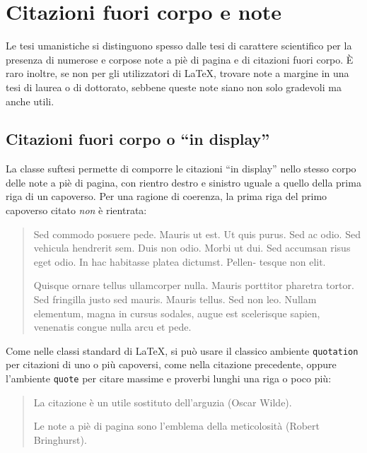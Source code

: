 \documentclass{suftesi}
\newcommand*{\env}[1]{\texttt{#1}}
\def\suftesi{\textsf{suftesi}}
\begin{document}
\section{Citazioni fuori corpo e note}

Le tesi umanistiche si distinguono spesso dalle tesi di carattere scientifico per la presenza di numerose e corpose note a piè di pagina e di citazioni fuori corpo. È raro inoltre, se non per gli utilizzatori di \LaTeX, trovare note a margine in una tesi di laurea o di dottorato, sebbene queste note siano non solo gradevoli ma anche utili.

\subsection{Citazioni fuori corpo o ``in display''}

La classe \suftesi{} permette di comporre le citazioni ``in display'' nello stesso corpo delle note a piè di pagina, con rientro destro e sinistro uguale a quello della prima riga di un capoverso. Per una ragione di coerenza, la prima riga del primo capoverso citato \emph{non} è rientrata:
\begin{quotation}
Sed commodo posuere pede. Mauris ut est. Ut quis purus. Sed ac odio. Sed vehicula hendrerit sem. Duis non odio. Morbi ut dui. Sed accumsan risus eget odio. In hac habitasse platea dictumst. Pellen- tesque non elit.

Quisque ornare tellus ullamcorper nulla. Mauris porttitor pharetra tortor. Sed fringilla justo sed mauris. Mauris tellus. Sed non leo. Nullam elementum, magna in cursus sodales, augue est scelerisque sapien, venenatis\marginpar{Ambiente \emph{\env{quotation}}} congue nulla arcu et pede.
\end{quotation}

Come nelle classi standard di \LaTeX, si può usare il classico ambiente \env{quotation} per citazioni di uno o più capoversi, come nella
citazione precedente, oppure l'ambiente \env{quote} per citare massime
e proverbi lunghi una riga o poco più:
\begin{quote}
La citazione è un utile sostituto dell'arguzia (Oscar Wilde).\marginpar{Ambiente \emph{\env{quote}}} 

Le note a piè di pagina sono l'emblema della meticolosità (Robert Bringhurst).
\end{quote}
\end{document}
